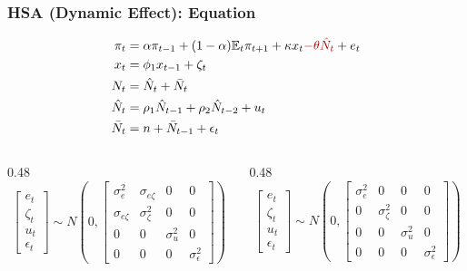 \documentclass{beamer}
\begin{document}
\begin{frame}
  \frametitle{HSA (Dynamic Effect): Equation}
  \begin{equation*}
    \begin{aligned}
      \pi_t &= \alpha \pi_{t-1} + (1-\alpha)\mathbb{E}_t \pi_{t+1} + \kappa x_t {\color{red!70!black}{- \theta \hat{N}_t}} + e_t \\
      x_t &= \phi_1 x_{t-1} + \zeta_t \\
      N_t &= \hat{N}_t + \bar{N}_t \\
      \hat{N}_t &= \rho_1 \hat{N}_{t-1} + \rho_2 \hat{N}_{t-2} + u_t \\
      \bar{N}_t &= n + \bar{N}_{t-1} + \epsilon_t
    \end{aligned}
  \end{equation*}
  \begin{columns}[T,onlytextwidth]
    \begin{column}{0.48\textwidth}
      \centering
      \scriptsize
      \begin{equation*}
        \begin{bmatrix}
          e_t \\ \zeta_t \\ u_t \\ \epsilon_t
        \end{bmatrix}
        \sim N\!\left(
        0,
        \begin{bmatrix}
          \sigma_e^2 & \sigma_{e\zeta} & 0 & 0 \\
          \sigma_{e\zeta} & \sigma_\zeta^2 & 0 & 0 \\
          0 & 0 & \sigma_u^2 & 0 \\
          0 & 0 & 0 & \sigma_\epsilon^2
        \end{bmatrix}
        \right)
      \end{equation*}
    \end{column}

    \begin{column}{0.48\textwidth}
      \centering
      \scriptsize
      \begin{equation*}
        \begin{bmatrix}
          e_t \\ \zeta_t \\ u_t \\ \epsilon_t
        \end{bmatrix}
        \sim N\!\left(
        0,
        \begin{bmatrix}
          \sigma_e^2 & 0 & 0 & 0 \\
          0 & \sigma_\zeta^2 & 0 & 0 \\
          0 & 0 & \sigma_u^2 & 0 \\
          0 & 0 & 0 & \sigma_\epsilon^2
        \end{bmatrix}
        \right)
      \end{equation*}
    \end{column}
  \end{columns}
\end{frame}
\end{document}
